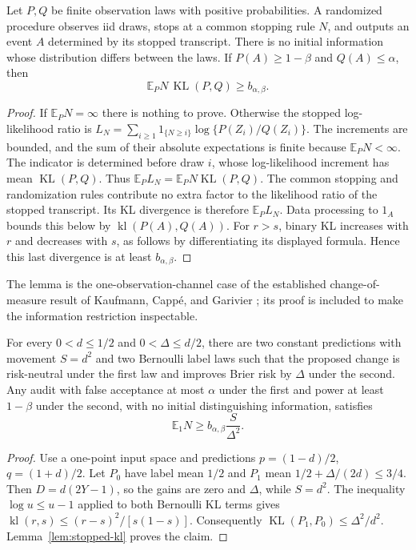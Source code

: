 \begin{lemma}
\label{lem:stopped-kl}
Let $P,Q$ be finite observation laws with positive probabilities.
A randomized procedure observes iid draws, stops at a common stopping rule
$N$, and outputs an event $A$ determined by its stopped transcript.
There is no initial information whose distribution differs between the laws.
If $P(A)\ge1-\beta$ and $Q(A)\le\alpha$, then
\[
 \mathbb E_PN\,\operatorname{KL}(P,Q)\ge b_{\alpha,\beta}.
\]
\end{lemma}
\begin{proof}
If $\mathbb E_PN=\infty$ there is nothing to prove. Otherwise the stopped
log-likelihood ratio is
$L_N=\sum_{i\ge1}1_{\{N\ge i\}}\log\{P(Z_i)/Q(Z_i)\}$.
The increments are bounded, and the sum of their absolute expectations
is finite because $\mathbb E_PN<\infty$. The indicator is determined
before draw $i$, whose log-likelihood increment has mean
$\operatorname{KL}(P,Q)$. Thus
$\mathbb E_PL_N=\mathbb E_PN\operatorname{KL}(P,Q)$.
The common stopping and randomization rules contribute no extra factor
to the likelihood ratio of the stopped transcript. Its KL divergence is
therefore $\mathbb E_PL_N$. Data processing to $1_A$ bounds this below by
$\operatorname{kl}(P(A),Q(A))$.
For $r>s$, binary KL increases with $r$ and decreases with $s$, as follows
by differentiating its displayed formula. Hence this last divergence is
at least $b_{\alpha,\beta}$.
\end{proof}
The lemma is the one-observation-channel case of the established
change-of-measure result of Kaufmann, Capp\'e, and Garivier
\cite[Lemma 1 and Appendix A.1]{kaufmann2016}; its proof is included to
make the information restriction inspectable.

\begin{theorem}
\label{thm:movement-lower}
For every $0<d\le1/2$ and $0<\Delta\le d/2$, there are two constant
predictions with movement $S=d^2$ and two Bernoulli label laws such that
the proposed change is risk-neutral under the first law and improves
Brier risk by $\Delta$ under the second. Any audit with false acceptance
at most $\alpha$ under the first and power at least $1-\beta$ under the
second, with no initial distinguishing information, satisfies
\[
 \mathbb E_1N\ge b_{\alpha,\beta}\frac{S}{\Delta^2}.
\]
\end{theorem}
\begin{proof}
Use a one-point input space and predictions $p=(1-d)/2$, $q=(1+d)/2$.
Let $P_0$ have label mean $1/2$ and $P_1$ mean
$1/2+\Delta/(2d)\le3/4$. Then $D=d(2Y-1)$, so the gains are zero
and $\Delta$, while $S=d^2$.
The inequality $\log u\le u-1$ applied to both Bernoulli KL terms gives
$\operatorname{kl}(r,s)\le(r-s)^2/[s(1-s)]$.
Consequently $\operatorname{KL}(P_1,P_0)\le\Delta^2/d^2$.
Lemma~\ref{lem:stopped-kl} proves the claim.
\end{proof}

